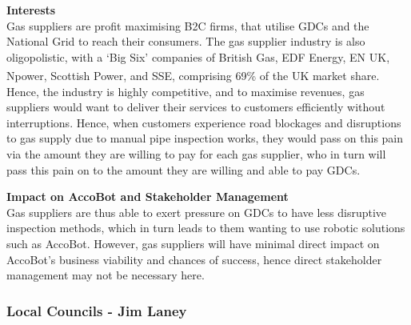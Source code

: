 \documentclass[11pt]{article}		%
\newcommand{\supercite}[1]{\textsuperscript{\cite{#1}}}		%
\begin{document}
		\textbf{Interests}
		\\
	    Gas suppliers are profit maximising B2C firms, that utilise GDCs and the National Grid to reach their consumers. The gas supplier industry is also oligopolistic, with a ‘Big Six’ companies of British Gas, EDF Energy, EN UK, Npower, Scottish Power, and SSE, comprising 69\% of the UK market share\supercite{big6}. 
        \\
        \hspace*{2ex}Hence, the industry is highly competitive, and to maximise revenues, gas suppliers would want to deliver their services to customers efficiently without interruptions. Hence, when customers experience road blockages and disruptions to gas supply due to manual pipe inspection works, they would pass on this pain via the amount they are willing to pay for each gas supplier, who in turn will pass this pain on to the amount they are willing and able to pay GDCs.
        
		\textbf{Impact on AccoBot and Stakeholder Management}
		\\
		Gas suppliers are thus able to exert pressure on GDCs to have less disruptive inspection methods, which in turn leads to them wanting to use robotic solutions such as AccoBot. However, gas suppliers will have minimal direct impact on AccoBot’s business viability and chances of success, hence direct stakeholder management may not be necessary here. 
		
		\subsubsection[Local Councils]{Local Councils - Jim Laney}
			
\end{document}
